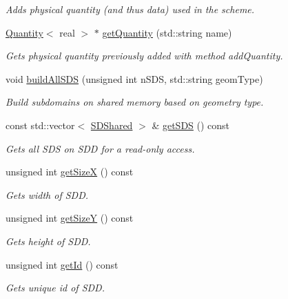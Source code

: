 \begin{DoxyCompactItemize}
\begin{DoxyCompactList}\small\item\em Adds physical quantity (and thus data) used in the scheme. \end{DoxyCompactList}\item 
\hyperlink{classQuantity}{Quantity}$<$ real $>$ $\ast$ \hyperlink{classSDDistributed_ade2c34b9bd189f3fb7409fc8dddd55ee}{get\+Quantity} (std\+::string name)
\begin{DoxyCompactList}\small\item\em Gets physical quantity previously added with method add\+Quantity. \end{DoxyCompactList}\item 
void \hyperlink{classSDDistributed_a3dbacea02c2d4f36310c81f87f90fe5a}{build\+All\+S\+DS} (unsigned int n\+S\+DS, std\+::string geom\+Type)
\begin{DoxyCompactList}\small\item\em Build subdomains on shared memory based on geometry type. \end{DoxyCompactList}\item 
const std\+::vector$<$ \hyperlink{classSDShared}{S\+D\+Shared} $>$ \& \hyperlink{classSDDistributed_a2bbdfc4e93476c4ee8cc0b55682a7a5b}{get\+S\+DS} () const
\begin{DoxyCompactList}\small\item\em Gets all S\+DS on S\+DD for a read-\/only access. \end{DoxyCompactList}\item 
unsigned int \hyperlink{classSDDistributed_a567b9535558271515166ce7ebd3f6c29}{get\+SizeX} () const
\begin{DoxyCompactList}\small\item\em Gets width of S\+DD. \end{DoxyCompactList}\item 
unsigned int \hyperlink{classSDDistributed_a9bf0049f4c95513b4d9c9a9bac0f6eb4}{get\+SizeY} () const
\begin{DoxyCompactList}\small\item\em Gets height of S\+DD. \end{DoxyCompactList}\item 
unsigned int \hyperlink{classSDDistributed_a0ab71d942dca319b739390055942a96a}{get\+Id} () const
\begin{DoxyCompactList}\small\item\em Gets unique id of S\+DD. \end{DoxyCompactList}\item 

\end{DoxyCompactItemize}
